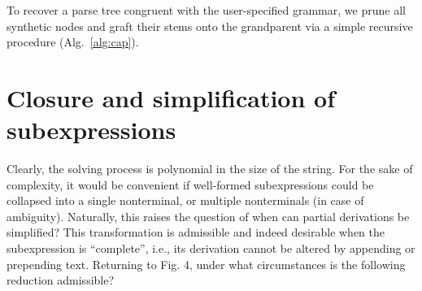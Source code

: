 \documentclass[sigplan,review,anonymous,acmsmall]{acmart}\settopmatter{printfolios=false,printccs=false,printacmref=false}
\begin{document}
    \noindent To recover a parse tree congruent with the user-specified grammar, we prune all synthetic nodes and graft their stems onto the grandparent via a simple recursive procedure (Alg.~\ref{alg:cap}).%

    

\section{Closure and simplification of subexpressions}

    Clearly, the solving process is polynomial in the size of the string. For the sake of complexity, it would be convenient if well-formed subexpressions could be collapsed into a single nonterminal, or multiple nonterminals (in case of ambiguity). Naturally, this raises the question of when can partial derivations be simplified? This transformation is admissible and indeed desirable when the subexpression is ``complete'', i.e., its derivation cannot be altered by appending or prepending text. Returning to Fig. 4, under what circumstances is the following reduction admissible?
\end{document}
